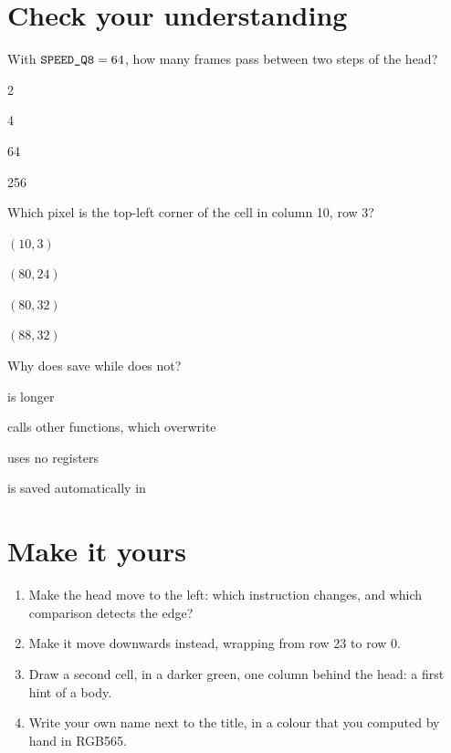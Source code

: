

\section{Check your understanding}

\begin{quiz}{With $\texttt{SPEED\_Q8}=64$, how many frames pass between two steps of the head?}
\item 2
\item 4
\item 64
\item 256
\end{quiz}

\begin{quiz}{Which pixel is the top-left corner of the cell in column 10, row 3?}
\item $(10, 3)$
\item $(80, 24)$
\item $(80, 32)$
\item $(88, 32)$
\end{quiz}

\begin{quiz}{Why does  save  while  does not?}
\item {} is longer
\item {} calls other functions, which overwrite 
\item {} uses no registers
\item {} is saved automatically in 
\end{quiz}

\section{Make it yours}

\begin{exercise}[on \prg]
\begin{enumerate}[nosep]
\item Make the head move to the left: which instruction changes, and which
  comparison detects the edge?
\item Make it move downwards instead, wrapping from row 23 to row 0.
\item Draw a second cell, in a darker green, one column behind the head: a
  first hint of a body.
\item Write your own name next to the title, in a colour that you computed by
  hand in RGB565.
\end{enumerate}
\end{exercise}

